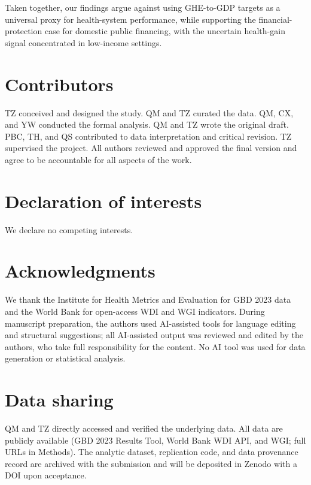 \documentclass[12pt,a4paper]{article}
\begin{document}
Taken together, our findings argue against using GHE-to-GDP targets as a universal proxy for health-system performance, while supporting the financial-protection case for domestic public financing, with the uncertain health-gain signal concentrated in low-income settings.





\section*{Contributors}

TZ conceived and designed the study. QM and TZ curated the data. QM, CX, and
YW conducted the formal analysis. QM and TZ wrote the original draft. PBC,
TH, and QS contributed to data interpretation and critical revision. TZ
supervised the project. All authors reviewed and approved the final version
and agree to be accountable for all aspects of the work.

\section*{Declaration of interests}
We declare no competing interests.

\section*{Acknowledgments}
We thank the Institute for Health Metrics and Evaluation for GBD 2023 data and
the World Bank for open-access WDI and WGI indicators. During manuscript
preparation, the authors used AI-assisted tools for language editing and
structural suggestions; all AI-assisted output was reviewed and edited by
the authors, who take full responsibility for the content. No AI tool was
used for data generation or statistical analysis.

\section*{Data sharing}
QM and TZ directly accessed and verified the underlying data. All data are
publicly available (GBD 2023 Results Tool, World Bank WDI API, and WGI; full
URLs in Methods). The analytic dataset, replication code, and data
provenance record are archived with the submission and will be deposited in Zenodo with a DOI upon acceptance.
\end{document}
